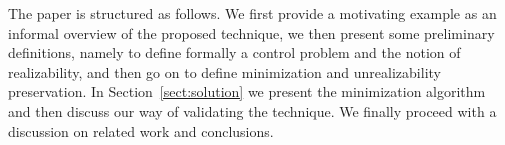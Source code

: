 
The paper is structured as follows. We first provide a motivating example as an informal overview of the proposed technique, we then present some preliminary definitions, namely to define formally a control problem and the notion of realizability, and then go on to define minimization and unrealizability preservation. In Section~\ref{sect:solution} we present the minimization algorithm and then discuss our way of validating the technique. We finally proceed with a discussion on related work and conclusions.
